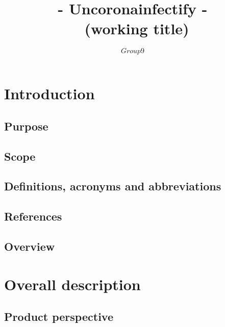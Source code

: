 \documentclass{report}
\title{
  \Huge - Uncoronainfectify -
  \\ \small (working title)
}
\author{
  $$Group 9$$
}
\begin{document}
  \maketitle
  \tableofcontents
  \newpage
  
  \chapter{Introduction}

  \section{Purpose}
  

  \section{Scope}
  

 \newpage
  \section{Definitions, acronyms and abbreviations}
  
  
  \section{References}
     

  \section{Overview}
  

  \newpage
  
\chapter{Overall description}
    
  \section{Product perspective}
  

  
\end{document}
